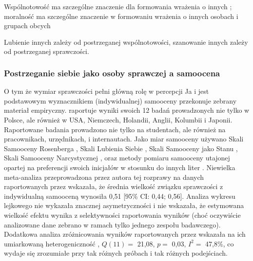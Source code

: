 \documentclass[man]{apa6}
\begin{document}
Wspólnotowość ma szczególne znaczenie dla formowania wrażenia o innych \parencite{wojciszke1998dominance}; moralność ma szczególne znaczenie w formowaniu wrażenia o innych osobach \parencite{brambilla2011looking, goodwin2014moral} i grupach obcych \parencite{brambilla2012you}

Lubienie innych zależy od postrzeganej wspólnotowości, szanowanie innych zależy od postrzeganej sprawczości.

\subsubsection{Postrzeganie siebie jako osoby sprawczej a samoocena}

O tym że wymiar sprawczości pełni główną rolę w percepcji Ja i jest podstawowym wyznacznikiem (indywidualnej) samooceny przekonuje zebrany materiał empiryczny. \textcite{wojciszke2010sprawczosc} raportuje wyniki swoich 12 badań prowadzonych nie tylko w Polsce, ale również w USA, Niemczech, Holandii, Anglii, Kolumbii i Japonii. Raportowane badania prowadzono nie tylko na studentach, ale również na pracownikach, urzędnikach, i internautach. Jako miar samooceny używano Skali Samooceny Rosenberga \parencite{rosenberg1965society}, Skali Lubienia Siebie \parencite{tafarodi2001two}, Skali Samooceny jako Stanu \parencite{heatherton1991development}, Skali Samooceny Narcystycznej \parencite{raskin1979narcissistic}, oraz metody pomiaru samooceny utajonej opartej na preferencji swoich inicjałów w stosunku do innych liter \parencite{koole20030nature}. Niewielka meta-analiza przeprowadzona przez autora tej rozprawy na danych raportowanych przez \textcite{wojciszke2010sprawczosc} wskazała, że średnia wielkość związku sprawczości z indywidualną samooceną wynosiła 0,51 [95\% CI: 0,44; 0,56]. Analiza wykresu lejkowego nie wykazała znacznej asymetryczności i nie wskazała, że estymowana wielkość efektu wynika z selektywności raportowania wyników (choć oczywiście analizowane dane zebrano w ramach tylko jednego zespołu badawczego). Dodatkowa analiza zróżnicowania wyników raportowanych przez \textcite{wojciszke2010sprawczosc} wskazała na ich umiarkowaną heterogeniczność \parencite[patrz,][]{higgins2003measuring}, $Q(11) = $ 21,08, $p = $ 0,03, $I^2 = $ 47,8\%, co wydaje się zrozumiałe przy tak różnych próbach i tak różnych podejściach.\\
\end{document}
